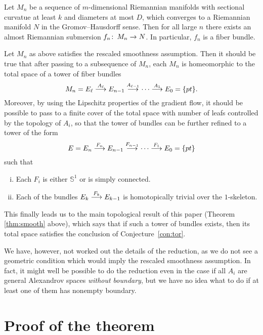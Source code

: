 \documentclass{amsart}
\begin{document}
\begin{thm}
Let $M_n$ be a sequence of $m$-dimensional Riemannian manifolds with sectional curvatue at least $k$ 
and diameters at most $D$, which converges to a Riemannian manifold $N$ in the Gromov--Hausdorff sense.
Then for all large $n$ there exists an almost Riemannian submersion $f_n\colon\thinspace M_n\to N$.
In particular, $f_n$ is a fiber bundle.
\end{thm}

Let $M_n$ as above satisfies the rescaled smoothness assumption.
Then it should be true that after passing to a subsequence of $M_n$,
each $M_n$ is homeomorphic to the total space of a tower of fiber bundles
\[
M_n=E_\ell\buildrel {A_\ell}\over \longrightarrow E_{n-1}\buildrel {A_{\ell-1}}\over\longrightarrow\dots\buildrel {A_1}\over\longrightarrow E_0=\{pt\}.
\]
Moreover, by using the Lipschitz properties of the gradient flow,
it should be possible to pass to a finite cover of the total space with number of leafs 
controlled by the topology of $A_i$, so that the tower of bundles can be
further refined  to a tower of the form
\[
E=E_n\buildrel {F_n}\over \longrightarrow E_{n-1}\buildrel {F_{n-1}}\over\longrightarrow\dots\buildrel {F_1}\over\longrightarrow E_0=\{pt\}
\]
such that
\begin{enumerate}[(i)]
\item Each $F_i$ is either $\mathbb{S}^{1}$ or is simply connected. 
\item Each of the bundles $E_k\buildrel {F_k}\over \longrightarrow E_{k-1}$ is homotopically trivial over the $1$-skeleton. 
\end{enumerate}

This finally leads us to the main topological result of this paper (Theorem \ref{thm:smooth} above),
which says that if such a tower of bundles exists, then its total space satisfies the conclusion of Conjecture~\ref{con:tor}.

We have, however, not worked out the details of the reduction, 
as we do not see a geometric condition which would imply the rescaled smoothness assumption.
In fact, it might  well be possible to do the reduction even in the case if all $A_i$ are general  Alexandrov spaces  \emph{without  boundary}, but we have no idea what to do if at least one of them has nonempty boundary.


\section{Proof of the theorem}
\end{document}
